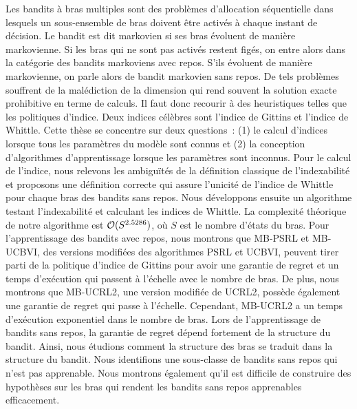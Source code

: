 Les bandits à bras multiples sont des problèmes d'allocation séquentielle dans lesquels un sous-ensemble de bras doivent être activés à chaque instant de décision.
Le bandit est dit markovien si ses bras évoluent de manière markovienne.
Si les bras qui ne sont pas activés restent figés, on entre alors dans la catégorie des bandits markoviens avec repos.
S'ils évoluent de manière markovienne, on parle alors de bandit markovien sans repos.
De tels problèmes souffrent de la malédiction de la dimension qui rend souvent la solution exacte prohibitive en terme de calculs.
Il faut donc recourir à des heuristiques telles que les politiques d'indice.
Deux indices célèbres sont l'indice de Gittins et l'indice de Whittle.
Cette thèse se concentre sur deux questions : (1) le calcul d'indices lorsque tous les paramètres du modèle sont connus et (2) la conception d'algorithmes d'apprentissage lorsque les paramètres sont inconnus.
Pour le calcul de l'indice, nous relevons les ambiguïtés de la définition classique de l'indexabilité et proposons une définition correcte qui assure l'unicité de l'indice de Whittle pour chaque bras des bandits sans repos.
Nous développons ensuite un algorithme testant l'indexabilité et calculant les indices de Whittle.
La complexité théorique de notre algorithme est $\mathcal{O}(S^{2.5286})$, où $S$ est le nombre d'états du bras.
Pour l'apprentissage des bandits avec repos, nous montrons que MB-PSRL et MB-UCBVI, des versions modifiées des algorithmes PSRL et UCBVI, peuvent tirer parti de la politique d'indice de Gittins pour avoir une garantie de regret et un temps d'exécution qui passent à l'échelle avec le nombre de bras.
De plus, nous montrons que MB-UCRL2, une version modifiée de UCRL2, possède également une garantie de regret qui passe à l'échelle.
Cependant, MB-UCRL2 a un temps d'exécution exponentiel dans le nombre de bras.
Lors de l'apprentissage de bandits sans repos, la garantie de regret dépend fortement de la structure du bandit. Ainsi, nous étudions comment la structure des bras se traduit dans la structure du bandit. Nous identifions une sous-classe de bandits sans repos qui n'est pas apprenable.
Nous montrons également qu'il est difficile de construire des hypothèses sur les bras qui rendent les bandits sans repos apprenables efficacement.
